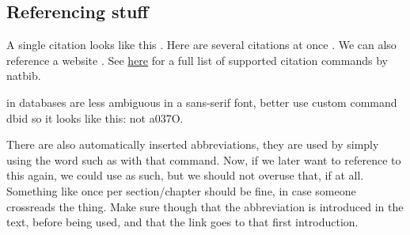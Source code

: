 \subsection{Referencing stuff} %
A single citation looks like this \citep{Kall2005}. Here are several citations at once \citep{Hofacker1994, Kall2005}. We can also reference a website \citep{CodonW}. See \href{http://merkel.zoneo.net/Latex/natbib.php}{here} for a full list of supported citation commands
by natbib.

\ids in databases are less ambiguous in a sans-serif font, better use custom command dbid so it looks like this:  not a037O.

There are also automatically inserted abbreviations, they are used by simply using the word such as  with that command. Now, if we later want to reference to this again,
we could use  as such, but we should not overuse that, if at all. Something like once per section/chapter should be fine, in case someone crossreads the thing.  Make sure though
that the abbreviation is introduced in the text, before being used, and that the link goes to that first introduction.